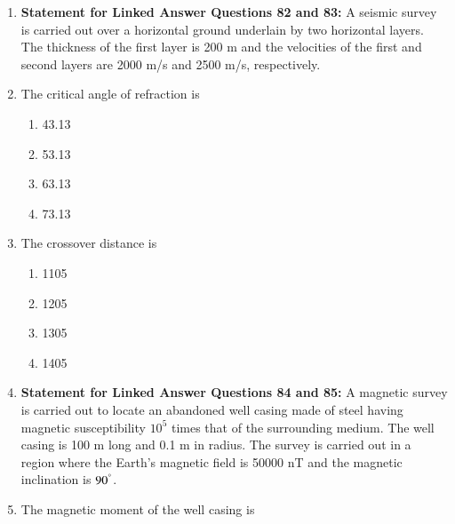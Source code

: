 \documentclass[journal,12pt,onecolumn]{IEEEtran}
\theoremstyle{remark}
\begin{document}
\begin{enumerate}
    \item[] \textbf{Statement for Linked Answer Questions 82 and 83:} A seismic survey is carried out over a horizontal ground underlain by two horizontal layers. The thickness of the first layer is 200 m and the velocities of the first and second layers are 2000 m/s and 2500 m/s, respectively.
    
    \item The critical angle of refraction  is

    \hfill{}
    
    \begin{multicols}{4}
        \begin{enumerate}
            \item 43.13
            \item 53.13
            \item 63.13
            \item 73.13
        \end{enumerate}
    \end{multicols}

    \item The crossover distance  is

    \hfill{}
    
    \begin{multicols}{4}
        \begin{enumerate}
            \item 1105
            \item 1205
            \item 1305
            \item 1405
        \end{enumerate}
    \end{multicols}



    \item[] \textbf{Statement for Linked Answer Questions 84 and 85:} A magnetic survey is carried out to locate an abandoned well casing made of steel having magnetic susceptibility $10^5$ times that of the surrounding medium. The well casing is 100 m long and 0.1 m in radius. The survey is carried out in a region where the Earth's magnetic field is 50000 nT and the magnetic inclination is $90^{\degree}$.
    
    \item The magnetic moment  of the well casing is


\end{enumerate}
\end{document}

